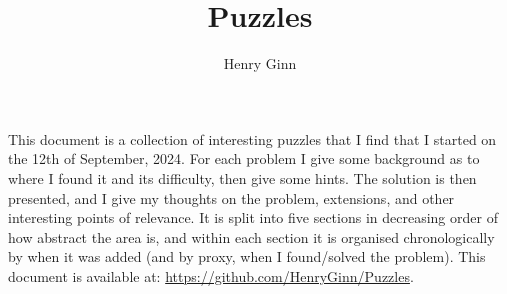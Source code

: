 



\title{Puzzles}
\author{Henry Ginn}
\def\keywords{Mathematics, Logic, Puzzle}



\maketitle

This document is a collection of interesting puzzles that I find that I started on the 12th of September, 2024. For each problem I give some background as to where I found it and its difficulty, then give some hints. The solution is then presented, and I give my thoughts on the problem, extensions, and other interesting points of relevance. It is split into five sections in decreasing order of how abstract the area is, and within each section it is organised chronologically by when it was added (and by proxy, when I found/solved the problem). This document is available at: \url{https://github.com/HenryGinn/Puzzles}.

\tableofcontents

\renewcommand{\contentsname}{}

\newpage

\newpage
\newpage

\newpage

\fancyhf{}
\fancyhead[R]{}
\fancyfoot[C]{\thepage}



